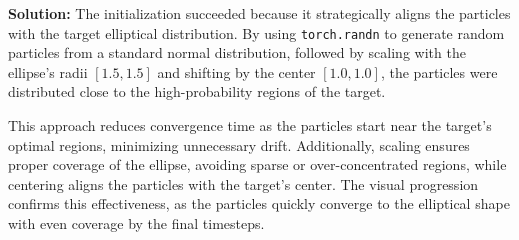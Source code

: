 \documentclass{article}
\newenvironment{solution}{\color{blue} \smallskip \textbf{Solution:}}{}
\begin{document}
\begin{enumerate}
\begin{solution}
The initialization succeeded because it strategically aligns the particles with the target elliptical distribution. By using \texttt{torch.randn} to generate random particles from a standard normal distribution, followed by scaling with the ellipse's radii \([1.5, 1.5]\) and shifting by the center \([1.0, 1.0]\), the particles were distributed close to the high-probability regions of the target. 

This approach reduces convergence time as the particles start near the target's optimal regions, minimizing unnecessary drift. Additionally, scaling ensures proper coverage of the ellipse, avoiding sparse or over-concentrated regions, while centering aligns the particles with the target's center. The visual progression confirms this effectiveness, as the particles quickly converge to the elliptical shape with even coverage by the final timesteps. 




    \end{solution}
\end{enumerate}\newpage
    
\end{document}
